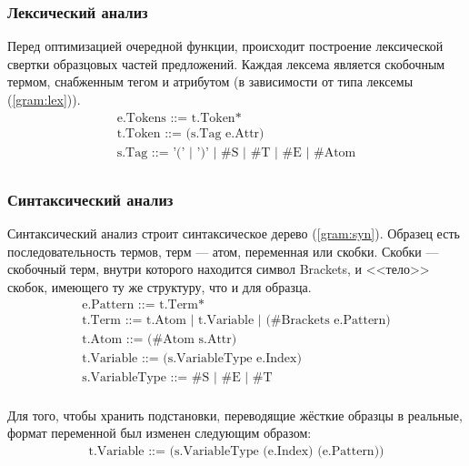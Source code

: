 \documentclass[12pt]{article}
\begin{document}
\subsubsection[Лексический анализ]{\large Лексический анализ}
\hspace{\parindent} Перед оптимизацией очередной функции, происходит построение лексической свертки образцовых частей предложений. Каждая лексема является скобочным термом, снабженным тегом и атрибутом (в зависимости от типа лексемы (\ref{gram:lex})).
\begin{equation}\label{gram:lex}
\begin{array}{l}
\textrm{e.Tokens ::= t.Token*} \\
\textrm{t.Token ::= (s.Tag e.Attr)} \\
\textrm{s.Tag ::= '(' | ')' | \#S | \#T | \#E | \#Atom} \\
\end{array}
\end{equation}

\subsubsection[Синтаксический анализ]{\large Синтаксический анализ}
\hspace{\parindent} Синтаксический анализ строит синтаксическое дерево (\ref{gram:syn}). Образец есть последовательность термов, терм --- атом, переменная или скобки. Скобки --- скобочный терм, внутри которого находится символ
Brackets, и <<тело>> скобок, имеющего ту же структуру, что и для образца.
\begin{equation}\label{gram:syn}
\begin{array}{l}
\textrm{e.Pattern ::= t.Term*} \\
\textrm{t.Term ::= t.Atom | t.Variable | (\#Brackets e.Pattern)} \\
\textrm{t.Atom ::= (\#Atom s.Attr)} \\
\textrm{t.Variable ::= (s.VariableType e.Index)} \\
\textrm{s.VariableType ::= \#S | \#E | \#T} \\
\end{array}
\end{equation}

\indent Для того, чтобы хранить подстановки, переводящие жёсткие образцы в реальные, формат переменной был изменен следующим образом:
\begin{equation*}
\begin{array}{l}
\textrm{t.Variable ::= (s.VariableType (e.Index) (e.Pattern))} \\
\end{array}
\end{equation*}
\end{document}
